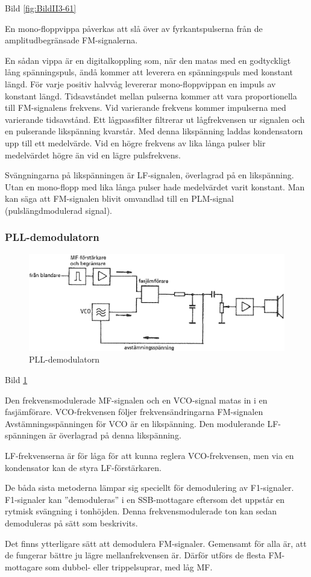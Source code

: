 Bild \ref{fig:BildII3-61}

En mono-floppvippa påverkas att slå över av fyrkantspulserna från de
amplitudbegränsade FM-signalerna.

En sådan vippa är en digitalkoppling som, när den matas med en
godtyckligt lång spänningspuls, ändå kommer att leverera en
spänningspuls med konstant längd. För varje positiv halvvåg levererar
mono-floppvippan en impuls av konstant längd. Tidsavståndet mellan
pulserna kommer att vara proportionella till FM-signalens
frekvens. Vid varierande frekvens kommer impulserna med varierande
tidsavstånd. Ett lågpassfilter filtrerar ut lågfrekvensen ur signalen
och en pulserande likspänning kvarstår. Med denna likspänning laddas
kondensatorn upp till ett medelvärde. Vid en högre frekvens av lika
långa pulser blir medelvärdet högre än vid en lägre pulsfrekvens.

Svängningarna på likspänningen är LF-signalen, överlagrad på en
likspänning. Utan en mono-flopp med lika långa pulser hade medelvärdet
varit konstant. Man kan säga att FM-signalen blivit omvandlad till en
PLM-signal (pulslängdmodulerad signal).

\subsubsection{PLL-demodulatorn}

\begin{figure}
\includegraphics[width=\textwidth]{images/cropped_pdfs/bild_2_3-62.pdf}
\caption{PLL-demodulatorn}
\label{fig:BildII3-62}
\end{figure}

Bild \ref{fig:BildII3-62}

Den frekvensmodulerade MF-signalen och en VCO-signal matas in i en
fasjämförare. VCO-frekvensen följer frekvensändringarna FM-signalen
Avstämningsspänningen för VCO är en likspänning. Den modulerande
LF-spänningen är överlagrad på denna likspänning.

LF-frekvenserna är för låga för att kunna reglera VCO-frekvensen, men
via en kondensator kan de styra LF-förstärkaren.

De båda sista metoderna lämpar sig speciellt för demodulering av
F1-signaler. F1-signaler kan ''demoduleras'' i en SSB-mottagare eftersom
det uppstår en rytmisk svängning i tonhöjden. Denna frekvensmodulerade
ton kan sedan demoduleras på sätt som beskrivits.

Det finns ytterligare sätt att demodulera FM-signaler. Gemensamt för
alla är, att de fungerar bättre ju lägre mellanfrekvensen är.  Därför
utförs de flesta FM-mottagare som dubbel- eller trippelsuprar, med låg
MF.
